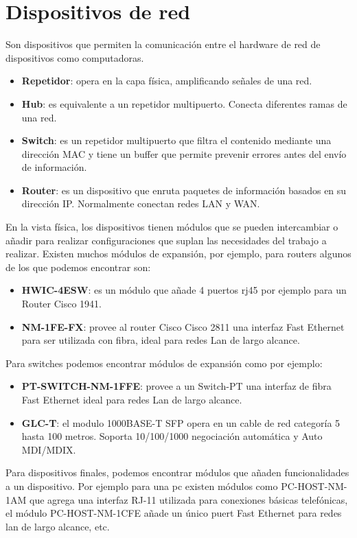 \documentclass{article}
\begin{document}
    \section{Dispositivos de red}
    Son dispositivos que permiten la comunicación entre el hardware de red de dispositivos como computadoras.
    \begin{itemize}
        \item {\bfseries Repetidor}: opera en la capa física, amplificando señales de una red.
        \item {\bfseries Hub}: es equivalente a un repetidor multipuerto. Conecta diferentes ramas de una red. 
        \item {\bfseries Switch}: es un repetidor multipuerto que filtra el contenido mediante una dirección MAC y tiene un buffer que permite prevenir errores antes del envío de información.
        \item {\bfseries Router}: es un dispositivo que enruta paquetes de información basados en su dirección IP. Normalmente conectan redes LAN y WAN.
    \end{itemize}
    En la vista física, los dispositivos tienen módulos que se pueden intercambiar o añadir para realizar configuraciones que suplan las necesidades del trabajo a realizar.\linebreak
    Existen muchos módulos de expansión, por ejemplo, para routers algunos de los que podemos encontrar son:
    \begin{itemize}
        \item {\bfseries HWIC-4ESW}: es un módulo que añade 4 puertos rj45 por ejemplo para un Router Cisco 1941.
        \item {\bfseries NM-1FE-FX}: provee al router Cisco Cisco 2811 una interfaz Fast Ethernet para ser utilizada con fibra, ideal para redes Lan de largo alcance.
    \end{itemize}
    Para switches podemos encontrar módulos de expansión como por ejemplo:
    \begin{itemize}
        \item {\bfseries PT-SWITCH-NM-1FFE}: provee a un Switch-PT una interfaz de fibra Fast Ethernet ideal para redes Lan de largo alcance.
        \item {\bfseries GLC-T}: el modulo 1000BASE-T SFP opera en un cable de red categoría 5 hasta 100 metros. Soporta 10/100/1000 negociación automática y Auto MDI/MDIX.
    \end{itemize}
    Para dispositivos finales, podemos encontrar módulos que añaden funcionalidades a un dispositivo. Por ejemplo para una pc existen módulos como PC-HOST-NM-1AM que agrega una interfaz RJ-11 utilizada para conexiones básicas telefónicas, el módulo PC-HOST-NM-1CFE añade un único puert Fast Ethernet para redes lan de largo alcance, etc.
\end{document}
